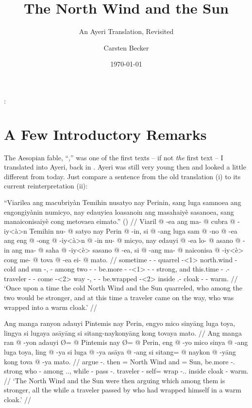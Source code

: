 \documentclass[12pt,paper=a4]{scrartcl}
\author{Carsten Becker}
\title{The North Wind and the Sun}
\subtitle{An Ayeri Translation, Revisited}
\date{\today} %
\newenvironment{mytitle}{
    \hfill
    \begin{minipage}{0.667\textwidth}
	\vspace{\baselineskip}
	\begin{center}
	    \Large
	    \sffamily\bfseries
	    \makeatletter
}{
	    \makeatother
	\end{center}
	\vspace{1em}
    \end{minipage}
    \hfill
}
\begin{document}

\begin{mytitle}
    \@title:\\
    \@subtitle
\end{mytitle}

\section{A Few Introductory Remarks}

The Aesopian fable, \enquote{,} was one of the first texts -- if not \emph{the} first text -- I translated into Ayeri, back in \citeyear{becker2004}. Ayeri was still very young then and looked a little different from today. Just compare a sentence from the old translation (i) to its current reinterpretation (ii):

\ex[exno=i, belowexskip=0em]
\begingl
	\glpreamble \enquote{Viarilea ang macubriyàn Temihin nusatyo nay Perinin, sang luga samnoea ang engongiyànin numicyo, nay edauyiea loasanoin ang masahaiyè sasanoea, sang manaiconisaiyè cong metovaea eimato.} (\cite[1]{becker2004}) //
	\gla Viaril @ -ea ang ma- @ cubra @ -iy<à>n Temihin nu- @ satyo nay Perin @ -in, si @ -ang luga sam @ -no @ -ea ang eng @ -ong @ -iy<à>n @ -in nu- @ micyo, nay edauyi @ -ea lo- @ asano @ -in ang ma- @ saha @ -iy<è> sasano @ -ea, si @ -ang ma- @ naiconisa @ -iy<è> cong me- @ tova @ -ea ei- @ mato. //
	\glb sometime -\Loc{} \AgtT{} \Pst{}- quarrel - north.wind \Aarg{}- cold and sun -\Top{}, \Rel{} -\Aarg{} among two -\Nmlz{} -\Loc{} \AgtT{} be.more -\Irr{} - -\Top{} \Aarg{}- strong, and this.time -\Loc{} \Indf{}.\Aarg{}- traveler -\Top{} \AgtT{} \Pst{}- come - way -\Loc{}, \Rel{} -\Aarg{} \Pst{}- be.wrapped - inside \Indf{}.\Parg{}- cloak -\Loc{} \Obl{}- warm. //
	\glft `Once upon a time the cold North Wind and the Sun quarreled, who among the two would be stronger, and at this time a traveler came on the way, who was wrapped into a warm cloak.' //
\endgl\xe

\ex[exno=ii]
\begingl
	\glpreamble Ang manga ranyon adauyi Pintemis nay Perin, engyo mico sinyāng luga toya, lingya si lugaya asāyāng si sitang-naykonyāng kong tovaya mato. //
	\gla Ang manga ran @ -yon adauyi Ø= @ Pintemis nay Ø= @ Perin, eng @ -yo mico sinya @ -ang luga toya, ling @ -ya si luga @ -ya asāya @ -ang si sitang= @ naykon @ -yāng kong tova @ -ya mato. //
	\glb \AgtT{} \Prog{} argue -\Tpl{}.\N{} then \Top{}= {North Wind} and \Top{}= Sun, be.more -\Tsg{}.\N{} strong who -\Aarg{} among \Tpl{}.\N{}.\Loc{}, while -\Loc{} \Rel{} pass -\Tsg{}.\M{} traveler -\Aarg{} \Rel{} self= wrap -\Tsg{}.\M{}.\Aarg{} inside cloak -\Loc{} warm. //
	\glft `The North Wind and the Sun were then arguing which among them is stronger, all the while a traveler passed by who had wrapped himself in a warm cloak.' //
\endgl
\xe
\end{document}
